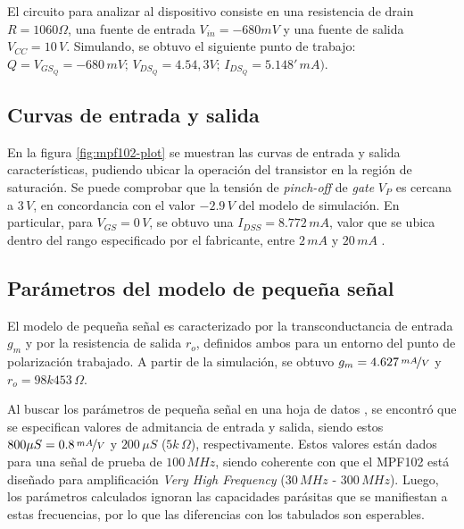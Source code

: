 \documentclass[../main.tex]{subfiles}
\begin{document}
El circuito para analizar al dispositivo consiste en una resistencia de drain $R = 1060\Omega$, una fuente de entrada $V_{in} = -680mV$ y una fuente de salida $V_{CC} = 10\,V$. Simulando, se obtuvo el siguiente punto de trabajo: $Q = V_{GS_Q} = -680\,mV;\, V_{DS_Q}=4.54,3V;\, I_{DS_Q}=5.148'\,mA)$.

\subsection{Curvas de entrada y salida}

En la figura \ref{fig:mpf102-plot} se muestran las curvas de entrada y salida características, pudiendo ubicar la operación del transistor en la región de saturación. Se puede comprobar que la tensión de \emph{pinch-off} de \emph{gate} $V_P$ es cercana a $3\,V$, en concordancia con el valor $-2.9\,V$ del modelo de simulación. En particular, para $V_{GS} = 0\,V$, se obtuvo una $I_{DSS} = 8.772\,mA$, valor que se ubica dentro del rango especificado por el fabricante, entre $2\,mA$ y $20\,mA$ \cite{mpf102}.



\subsection{Parámetros del modelo de pequeña señal}

El modelo de pequeña señal es caracterizado por la transconductancia de entrada $g_m$ y por la resistencia de salida $r_o$, definidos ambos para un entorno del punto de polarización trabajado. A partir de la simulación, se obtuvo $g_m = 4.627\, \nicefrac{mA}{V}$ y $r_o = 98k453\,\Omega$.

Al buscar los parámetros de pequeña señal en una hoja de datos \cite{mpf102}, se encontró que se especifican valores de admitancia de entrada y salida, siendo estos $800\mu S = 0.8\, \nicefrac{mA}{V}$ y $200\,\mu S$ ($5k\,\Omega$), respectivamente. Estos valores están dados para una señal de prueba de $100\,MHz$, siendo coherente con que el MPF102 está diseñado para amplificación \emph{Very High Frequency} ($30\,MHz$ - $300\,MHz$). Luego, los parámetros calculados ignoran las capacidades parásitas que se manifiestan a estas frecuencias, por lo que las diferencias con los tabulados son esperables.
\end{document}
